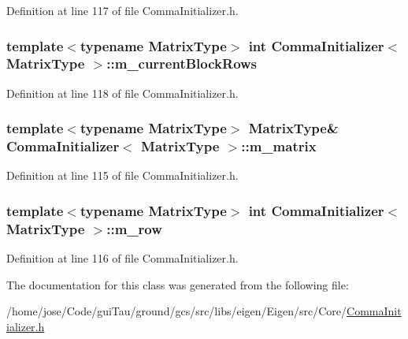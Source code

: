 Definition at line 117 of file Comma\-Initializer.\-h.

\hypertarget{struct_comma_initializer_a109c47338fbe98963a21a83c651bc883}{
\subsubsection[{m\-\_\-current\-Block\-Rows}]{\setlength{\rightskip}{0pt plus 5cm}template$<$typename Matrix\-Type$>$ {\bf int} {\bf Comma\-Initializer}$<$ Matrix\-Type $>$\-::m\-\_\-current\-Block\-Rows}}\label{struct_comma_initializer_a109c47338fbe98963a21a83c651bc883}


Definition at line 118 of file Comma\-Initializer.\-h.

\hypertarget{struct_comma_initializer_a7c8dc2c76a0f96266f67da34a9a8e70f}{
\subsubsection[{m\-\_\-matrix}]{\setlength{\rightskip}{0pt plus 5cm}template$<$typename Matrix\-Type$>$ Matrix\-Type\& {\bf Comma\-Initializer}$<$ Matrix\-Type $>$\-::m\-\_\-matrix}}\label{struct_comma_initializer_a7c8dc2c76a0f96266f67da34a9a8e70f}


Definition at line 115 of file Comma\-Initializer.\-h.

\hypertarget{struct_comma_initializer_a14c027351cb2b9c4945c7ff808570c35}{
\subsubsection[{m\-\_\-row}]{\setlength{\rightskip}{0pt plus 5cm}template$<$typename Matrix\-Type$>$ {\bf int} {\bf Comma\-Initializer}$<$ Matrix\-Type $>$\-::m\-\_\-row}}\label{struct_comma_initializer_a14c027351cb2b9c4945c7ff808570c35}


Definition at line 116 of file Comma\-Initializer.\-h.



The documentation for this class was generated from the following file\-:\begin{DoxyCompactItemize}
\item 
/home/jose/\-Code/gui\-Tau/ground/gcs/src/libs/eigen/\-Eigen/src/\-Core/\hyperlink{_comma_initializer_8h}{Comma\-Initializer.\-h}\end{DoxyCompactItemize}
